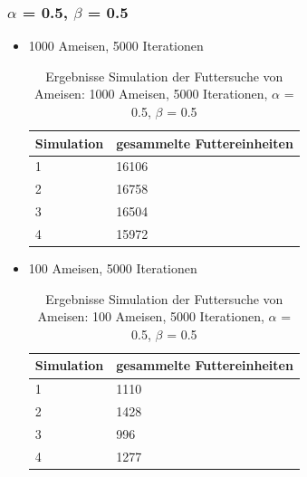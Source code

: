 \documentclass[a4paper, 11pt]{article}
\begin{document}
\subsubsection{$\alpha$ = 0.5, $\beta$ = 0.5}
\begin{itemize}
	\item 1000 Ameisen, 5000 Iterationen
	\begin{table}[h]
		\begin{tabular}{p{2.5cm}|p{11cm}}
			Simulation & gesammelte Futtereinheiten\\ \hline\hline
			1 & 16106\\ \hline
			2 & 16758\\ \hline
			3 & 16504\\ \hline
			4 & 15972\\ \hline
		\end{tabular}
		\caption{Ergebnisse Simulation der Futtersuche von Ameisen: 1000 Ameisen, 5000 Iterationen, $\alpha$ = 0.5, $\beta$ = 0.5}
		\label{tabframework}
	\end{table}
	\item 100 Ameisen, 5000 Iterationen
	\begin{table}[h]
		\begin{tabular}{p{2.5cm}|p{11cm}}
			Simulation & gesammelte Futtereinheiten\\ \hline\hline
			1 & 1110\\ \hline
			2 & 1428\\ \hline
			3 & 996\\ \hline
			4 & 1277\\ \hline
		\end{tabular}
		\caption{Ergebnisse Simulation der Futtersuche von Ameisen: 100 Ameisen, 5000 Iterationen, $\alpha$ = 0.5, $\beta$ = 0.5}
		\label{tabframework}
	\end{table}
\end{itemize}
\newpage
\end{document}
